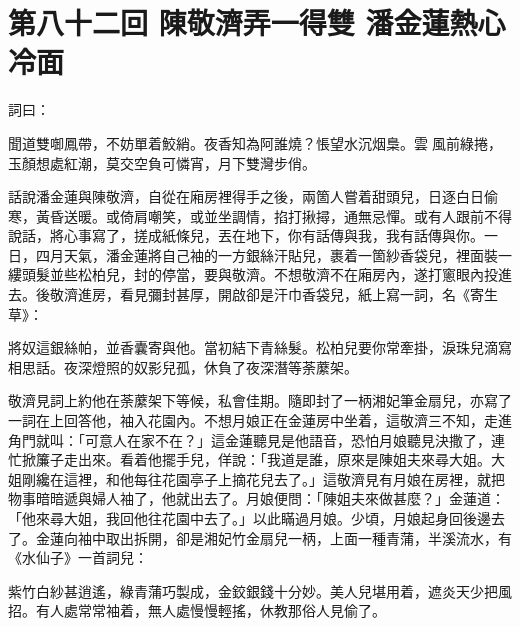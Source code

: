
\chapter*{第八十二回 陳敬濟弄一得雙 潘金蓮熱心冷面}


詞曰：

\begin{myquote}
聞道雙啣鳳帶，不妨單着鮫綃。夜香知為阿誰燒？悵望水沉烟梟。雲𩬆風前綠捲，玉顏想處紅潮，莫交空負可憐宵，月下雙灣步俏。

\end{myquote}

話說潘金蓮與陳敬濟，自從在廂房裡得手之後，兩箇人嘗着甜頭兒，日逐白日偷寒，黃昏送暖。或倚肩嘲笑，或並坐調情，掐打揪撏，通無忌憚。或有人跟前不得說話，將心事寫了，搓成紙條兒，丟在地下，你有話傳與我，我有話傳與你。一日，四月天氣，潘金蓮將自己袖的一方銀絲汗貼兒，裹着一箇紗香袋兒，裡面裝一縷頭髮並些松柏兒，封的停當，要與敬濟。不想敬濟不在廂房內，遂打窻眼內投進去。後敬濟進房，看見彌封甚厚，開啟卻是汗巾香袋兒，紙上寫一詞，名《寄生草》：

\begin{myquote}
將奴這銀絲帕，並香囊寄與他。當初結下青絲髮。松柏兒要你常牽掛，淚珠兒滴寫相思話。夜深燈照的奴影兒孤，休負了夜深潛等荼䕷架。
\end{myquote}

敬濟見詞上約他在荼䕷架下等候，私會佳期。隨即封了一柄湘妃筆金扇兒，亦寫了一詞在上回答他，袖入花園內。不想月娘正在金蓮房中坐着，這敬濟三不知，走進角門就叫：「可意人在家不在？」這金蓮聽見是他語音，恐怕月娘聽見決撒了，連忙掀簾子走出來。看着他擺手兒，佯說：「我道是誰，原來是陳姐夫來尋大姐。大姐剛纔在這裡，和他每往花園亭子上摘花兒去了。」{}這敬濟見有月娘在房裡，就把物事暗暗遞與婦人袖了，他就出去了。月娘便問：「陳姐夫來做甚麼？」金蓮道：「他來尋大姐，我回他往花園中去了。」以此瞞過月娘。少頃，月娘起身回後邊去了。金蓮向袖中取出拆開，卻是湘妃竹金扇兒一柄，上面一種青蒲，半溪流水，有《水仙子》一首詞兒：

\begin{myquote}
紫竹白紗甚逍遙，綠青蒲巧製成，金鉸銀錢十分妙。美人兒堪用着，遮炎天少把風招。有人處常常袖着，無人處慢慢輕搖，休教那俗人見偷了。{}
\end{myquote}

